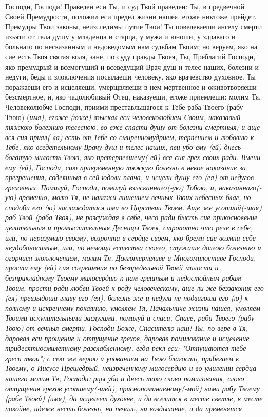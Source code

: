 \mychapterending




Господи, Господи! Праведен еси Ты, и суд Твой праведен: Ты, в предвечной Своей Премудрости, положил еси предел жизни нашея, егоже никтоже прейдет. Премудры Твои законы, неизследимы путие Твои! Ты повелеваеши ангелу смерти изъяти от тела душу у младенца и старца, у мужа и юноши, у здраваго и больнаго по несказанным и недоведомым нам судьбам Твоим; но веруем, яко на сие есть Твоя святая воля, зане, по суду правды Твоея, Ты, Преблагий Господи, яко премудрый и всемогущий и всеведущий Врач душ и телес наших, болезни и недуги, беды и злоключения посылаеши человеку, яко врачевство духовное. Ты поражаеши его и исцеляеши, умерщвляеши в нем мертвенное и оживотворяеши безсмертное, и, яко чадолюбивый Отец, наказуеши, егоже приемлеши: молим Тя, Человеколюбче Господи, приими преставльшагося к Тебе раба Твоего (рабу Твою) (\itshape имя\normalfont{}), егоже (юже) взыскал еси человеколюбием Своим, наказавый тяжкою болезнию телесною, во еже спасти душу от болезни смертныя; и аще вся сия приял(-ла) есть от Тебе со смиренномудрием, терпением и любовию к Тебе, яко вседетельному Врачу душ и телес наших, яви убо ему (ей) днесь богатую милость Твою, яко претерпевшему(-ей) вся сия грех своих ради. Вмени ему (ей), Господи, сию привременную тяжкую болезнь в некое наказание за прегрешения, содеянныя в сей юдоли плача, и исцели душу его (ея) от недугов греховных. Помилуй, Господи, помилуй взысканнаго(-ую) Тобою, и, наказаннаго(-ую) временно, молю Тя, не накажи лишением вечных Твоих небесных благ, но сподоби его (ю) наслаждатися ими во Царствии Твоем. Аще же усопший(-шая) раб Твой (раба Твоя), не разсуждая в себе, чесо ради бысть сие прикосновение целительныя и промыслительныя Десницы Твоея, стропотно что рече в себе, или, по неразумию своему, возропта в сердце своем, яко бремя сие возмни себе неудобоносимым, или, по немощи естества своего, стужаше долгою болезнию и огорчися злоключением, молим Тя, Долготерпеливе и Многомилостиве Господи, прости ему (ей) сия согрешения по безпредельной Твоей милости и безприкладному Твоему милосердию к нам грешным и недостойным рабам Твоим, прости ради любви Твоей к роду человеческому; аще ли же беззакония его (ея) превзыдоша главу его (ея), болезнь же и недуги не подвигоша его (ю) к полному и искреннему покаянию, умоляем Тя, Начальниче жизни нашея, умоляем Твоими искупительными заслугами, помилуй и спаси, Спасе, раба Твоего (рабу Твою) от вечныя смерти. Господи Боже, Спасителю наш! Ты, по вере в Тя, даровал еси прощение и отпущение грехов, даровав помилование и исцеление тридесятиосмилетнему разслабленному, егда рекл еси: "Отпущаются тебе греси твои"; с сею же верою и упованием на Твою благость, прибегаем к Твоему, о Иисусе Прещедрый, неизреченному милосердию и во умилении сердца нашего молим Тя, Господи: рцы убо и днесь тако слово помилования, слово отпущения грехов усопшему(-шей), приснопоминаемому(-мой) нами рабу Твоему (рабе Твоей) (\itshape имя\normalfont{}), да исцелеет духовне, и да вселится в месте светле, в месте покойне, идеже несть болезнь, ни печаль, ни воздыхание, и да пременятся 